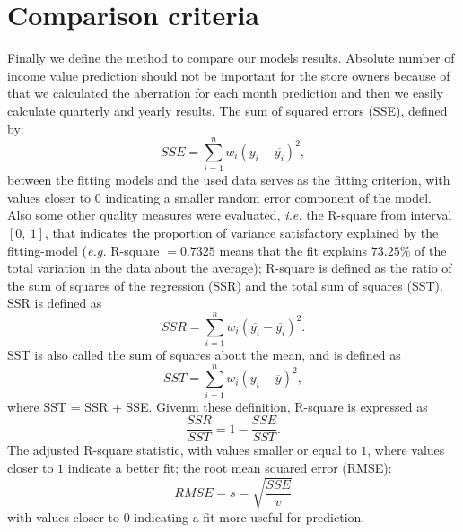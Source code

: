 \section{Comparison criteria} \label{subsec:comparison}
Finally we define the method to compare our models results.
Absolute number of income value prediction should not be important for the store owners because of that we calculated the aberration for each month
prediction and then we easily calculate quarterly and yearly results.
The sum of squared errors (SSE), defined by:
$$SSE = \sum^n_{i=1}w_i(y_i - \overline{y_i})^2,$$
between the fitting models and the used data serves as the fitting criterion,
with values closer to $0$ indicating a smaller random error component of the model.
Also some other quality measures were evaluated, \textit{i.e.} the R-square from interval $[0,\ 1]$,
that indicates the proportion of variance satisfactory explained by the fitting-model (\textit{e.g.}  R-square $= 0.7325$ means
that the fit explains $73.25\%$ of the total variation in the data about the average);
R-square is defined as the ratio of the sum of squares of the regression (SSR) and the total sum of squares (SST).
SSR is defined as
$$SSR = \sum_{i=1}^nw_i(\overline{y_i} - \overline{y_i})^2.$$
SST is also called the sum of squares about the mean, and is defined as
$$SST = \sum_{i=1}^nw_i(y_i - \overline{y})^2,$$
where SST = SSR + SSE. Givenm these definition, R-square is expressed as
$$\frac{SSR}{SST} = 1 - \frac{SSE}{SST}.$$
The adjusted R-square statistic, with values smaller or equal to $1$, where values closer to $1$ indicate a better fit; the root mean squared error (RMSE):\\
$$RMSE = s = \sqrt{\frac{SSE}{v}}$$
with values closer to $0$ indicating a fit more useful for prediction.
